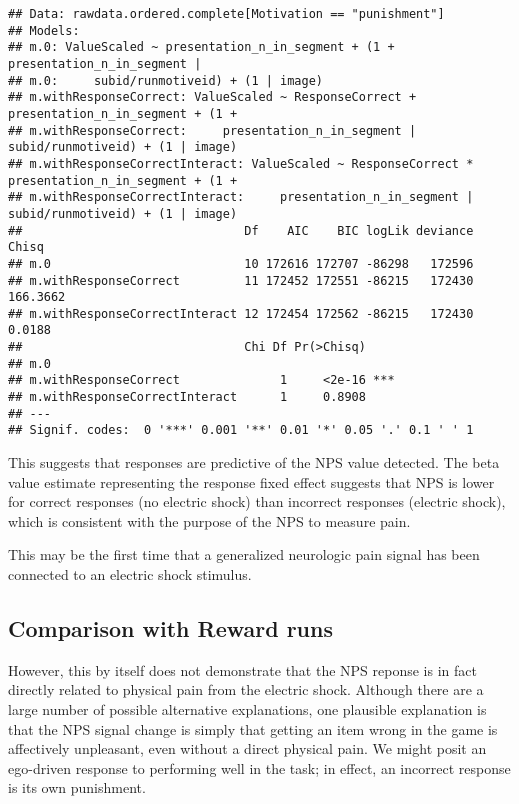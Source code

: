 \documentclass[]{article}
\begin{document}
\begin{verbatim}
## Data: rawdata.ordered.complete[Motivation == "punishment"]
## Models:
## m.0: ValueScaled ~ presentation_n_in_segment + (1 + presentation_n_in_segment | 
## m.0:     subid/runmotiveid) + (1 | image)
## m.withResponseCorrect: ValueScaled ~ ResponseCorrect + presentation_n_in_segment + (1 + 
## m.withResponseCorrect:     presentation_n_in_segment | subid/runmotiveid) + (1 | image)
## m.withResponseCorrectInteract: ValueScaled ~ ResponseCorrect * presentation_n_in_segment + (1 + 
## m.withResponseCorrectInteract:     presentation_n_in_segment | subid/runmotiveid) + (1 | image)
##                               Df    AIC    BIC logLik deviance    Chisq
## m.0                           10 172616 172707 -86298   172596         
## m.withResponseCorrect         11 172452 172551 -86215   172430 166.3662
## m.withResponseCorrectInteract 12 172454 172562 -86215   172430   0.0188
##                               Chi Df Pr(>Chisq)    
## m.0                                                
## m.withResponseCorrect              1     <2e-16 ***
## m.withResponseCorrectInteract      1     0.8908    
## ---
## Signif. codes:  0 '***' 0.001 '**' 0.01 '*' 0.05 '.' 0.1 ' ' 1
\end{verbatim}

This suggests that responses are predictive of the NPS value detected.
The beta value estimate representing the response fixed effect suggests
that NPS is lower for correct responses (no electric shock) than
incorrect responses (electric shock), which is consistent with the
purpose of the NPS to measure pain.

This may be the first time that a generalized neurologic pain signal has
been connected to an electric shock stimulus.

\subsection{Comparison with Reward
runs}\label{comparison-with-reward-runs}

However, this by itself does not demonstrate that the NPS reponse is in
fact directly related to physical pain from the electric shock. Although
there are a large number of possible alternative explanations, one
plausible explanation is that the NPS signal change is simply that
getting an item wrong in the game is affectively unpleasant, even
without a direct physical pain. We might posit an ego-driven response to
performing well in the task; in effect, an incorrect response is its own
punishment.
\end{document}
